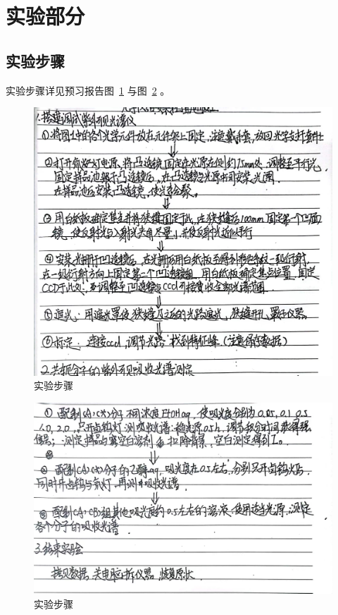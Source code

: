 \documentclass[cn,hazy,pku,12pt,normal,math=newtx,cite=super]{elegantnote}
\begin{document}
\section{实验部分}

\subsection{实验步骤}

实验步骤详见预习报告图~\ref{a} 与图~\ref{4} 。

\begin{figure}[htbp]
    \centering
    \includegraphics[width = .88\textwidth]{image/yxbg_2.5.png}
    \caption{实验步骤}\label{a}
\end{figure}

\begin{figure}[htbp]
    \centering
    \includegraphics[width = .88\textwidth]{image/yxbg_3.jpg}
    \caption{实验步骤}\label{4}
\end{figure}
\end{document}
